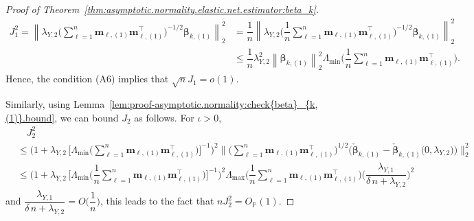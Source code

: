 \documentclass[
  12pt]{article}
\def\M{\mathbf{m}}
\begin{document}
\begin{proof}[Proof of Theorem~\ref{thm:asymptotic.normality.elastic.net.estimator:beta_k}]
\begin{align}
		J_{1}^{2}  =   \left\| \lambda_{Y,2}  \Big( \sum_{\ell = 1}^{n} \M_{\ell,(1)}  \M_{\ell,(1)}^{\top} \Big)^{-1/2}  \bm{\beta}_{k, (1)}   \right\|_{2}^{2} 
		&= \dfrac{1}{n} \left\| \lambda_{Y,2}  \Big( \dfrac{1}{n} \sum_{\ell = 1}^{n} \M_{\ell,(1)}  \M_{\ell,(1)}^{\top} \Big)^{-1/2}  \bm{\beta}_{k, (1)}   \right\|_{2}^{2}  \nonumber   
		\\
		&\leq  \dfrac{1}{n}  \lambda_{Y,2}^{2} \left\| \bm{\beta}_{k, (1)} \right\|_{2}^{2} 
		\Lambda_{\min} \Big( \dfrac{1}{n} \sum_{\ell = 1}^{n} \M_{\ell,(1)}  \M_{\ell,(1)}^{\top} \Big). 
	\end{align}
	Hence, the condition (A6) implies that $\sqrt{n} J_{1} = o(1)$.  
	
	\medskip
	
	Similarly, using Lemma~\ref{lem:proof-asymptotic.normality:check{beta}_{k,(1)}.bound}, we can bound $J_{2}$ as follows. For $\iota  >  0$,  	
	\begin{align*}
		& \quad J_{2}^{2}  
		\\
		& \leq  \Big( 1 +  \lambda_{Y,2}  \,   \Big[    \Lambda_{\min} \big( \sum_{\ell = 1}^{n} \M_{\ell,(1)}  \M_{\ell,(1)}^{\top} \big)  \Big]^{-1}     \Big)^{2}   \Big\|  \Big( \sum_{\ell = 1}^{n} \M_{\ell,(1)}  \M_{\ell,(1)}^{\top} \Big)^{1/2}  \Big( \check{\bm{\beta}}_{k,(1)} -  \check{\bm{\beta}}_{k,(1)} \big( 0 , \lambda_{Y,2} \big)  \Big)  \Big\|_{2}^{2}
		\\
		&\leq  \Big( 1 +  \lambda_{Y,2}  \,   \Big[    \Lambda_{\min} \big(  \dfrac{1}{n}   \sum_{\ell = 1}^{n} \M_{\ell,(1)}  \M_{\ell,(1)}^{\top} \big)  \Big]^{-1}     \Big)^{2} 
		\Lambda_{\max} \big( \dfrac{1}{n}   \sum_{\ell = 1}^{n} \M_{\ell,(1)}  \M_{\ell,(1)}^{\top} \big)    
		\Big(  \dfrac{ \lambda_{Y,1}   }{\delta  \,  n  +   \lambda_{Y,2}} \Big)^{2}  
	\end{align*} 
	and  $
		\dfrac{ \lambda_{Y,1}  }{\delta  \,  n  +   \lambda_{Y,2}}  = O \Big( \dfrac{1}{n} \Big)  $, this leads to the fact that 
	$n J_{2}^{2}  =     O_{\mathbb{P}}(1) 
	$.
	
	\medskip 
	

\end{proof}
\end{document}
